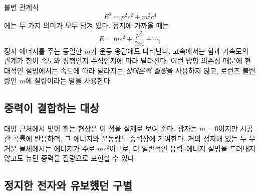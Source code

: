 불변 관계식
\begin{equation}
  E^2=p^2c^2+m^2c^4
  \label{eq:l09-energy-momentum}
\end{equation}
에는 두 가지 의미가 모두 담겨 있다. 정지에 가까울 때는
\begin{equation}
  E=mc^2+\frac{p^2}{2m}+\cdots,
\end{equation}
정지 에너지를 주는 동일한 \(m\)가 운동 응답에도 나타난다. 고속에서는 힘과 가속도의 관계가 힘이 속도와 평행인지 수직인지에 따라 달라진다. 이런 방향 의존성 때문에 현대적인 설명에서는 속도에 따라 달라지는 \emph{상대론적 질량}을 사용하지 않고, 로런츠 불변량인 \(m\)에 질량이라는 말을 사용한다.

\subsection{중력이 결합하는 대상}

\begin{classroomqa}
\end{classroomqa}

태양 근처에서 빛이 휘는 현상은 이 점을 실제로 보여 준다. 광자는 \(m=0\)이지만 시공간 곡률에 반응하며, 그 에너지와 운동량도 중력장에 기여한다. 거의 정지해 있는 두 무거운 물체에서는 에너지가 주로 \(mc^2\)이므로, 더 일반적인 응력--에너지 설명을 드러내지 않고도 뉴턴 중력을 질량으로 표현할 수 있다.

\begin{classroomqa}
\end{classroomqa}

\subsection{정지한 전자와 유보했던 구별}

